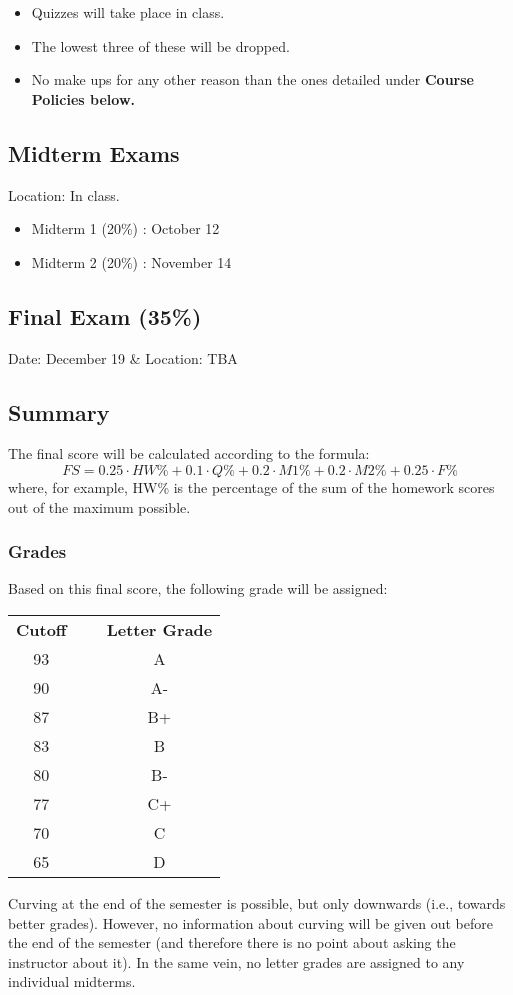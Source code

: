 \documentclass[10pt]{article}
\theoremstyle{definition}
\begin{document}
\begin{itemize}
\item Quizzes will take place in class.  
\item The lowest three of these will be dropped.
\item No make ups for any other reason than the ones detailed under \bf{Course Policies} below.
\end{itemize}

 

\subsection*{Midterm Exams}
Location: In class.
\begin{itemize}
\item Midterm 1 (20\%) : October 12
\item Midterm 2 (20\%) : November 14
\end{itemize}
\subsection*{Final Exam (35\%)}
Date: December 19 \& Location: TBA



\subsection*{Summary}
The final score will be calculated according to the formula:
\[
FS=0.25\cdot HW\%+0.1\cdot Q\%+0.2\cdot M1\%+0.2\cdot M2\%+0.25\cdot F\%
\]
where, for example, HW\% is the percentage of the sum of the homework scores out of the maximum possible.

\subsubsection*{Grades}

Based on this final score, the following grade will be assigned:
\begin{center}
\begin{tabular}{c c c}
\textbf{Cutoff}&~&\textbf{Letter Grade}\\
93 & ~ &	A\\
90 &~&	A-\\
87 &~&	B+\\
83 &~&	B\\
80 &~&	B-\\
77 &~&	C+\\
70 &~&	C\\
65 &~&	D\\
\end{tabular}
\end{center}
Curving at the end of the semester is possible, but only downwards (i.e., towards better grades). However, no information about curving will be given out before the end of the semester (and therefore there is no point about asking the instructor about it). In the same vein, no letter grades are assigned to any individual midterms.
\end{document}
